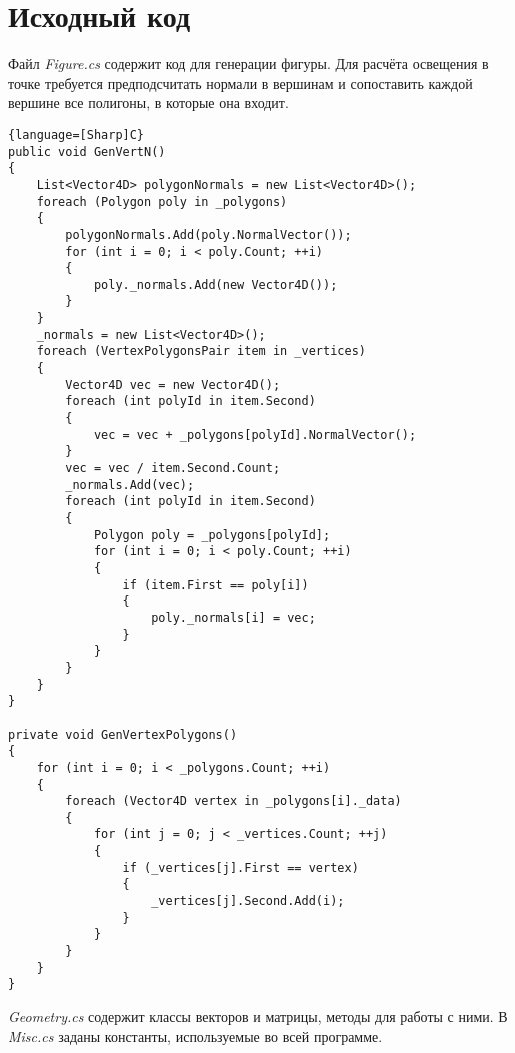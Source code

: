 \section{Исходный код}

Файл \textit{Figure.cs} содержит код для генерации фигуры. Для расчёта освещения в точке требуется предподсчитать нормали в вершинам и сопоставить каждой вершине все полигоны, в которые она входит.

\begin{lstlisting}{language=[Sharp]C}
public void GenVertN()
{
    List<Vector4D> polygonNormals = new List<Vector4D>();
    foreach (Polygon poly in _polygons)
    {
        polygonNormals.Add(poly.NormalVector());
        for (int i = 0; i < poly.Count; ++i)
        {
            poly._normals.Add(new Vector4D());
        }
    }
    _normals = new List<Vector4D>();
    foreach (VertexPolygonsPair item in _vertices)
    {
        Vector4D vec = new Vector4D();
        foreach (int polyId in item.Second)
        {
            vec = vec + _polygons[polyId].NormalVector();
        }
        vec = vec / item.Second.Count;
        _normals.Add(vec);
        foreach (int polyId in item.Second)
        {
            Polygon poly = _polygons[polyId];
            for (int i = 0; i < poly.Count; ++i)
            {
                if (item.First == poly[i])
                {
                    poly._normals[i] = vec;
                }
            }
        }
    }
}

private void GenVertexPolygons()
{
    for (int i = 0; i < _polygons.Count; ++i)
    {
        foreach (Vector4D vertex in _polygons[i]._data)
        {
            for (int j = 0; j < _vertices.Count; ++j)
            {
                if (_vertices[j].First == vertex)
                {
                    _vertices[j].Second.Add(i);
                }
            }
        }
    }
}
\end{lstlisting}

\textit{Geometry.cs} содержит классы векторов и матрицы, методы для работы с ними.
В \textit{Misc.cs} заданы константы, используемые во всей программе.

